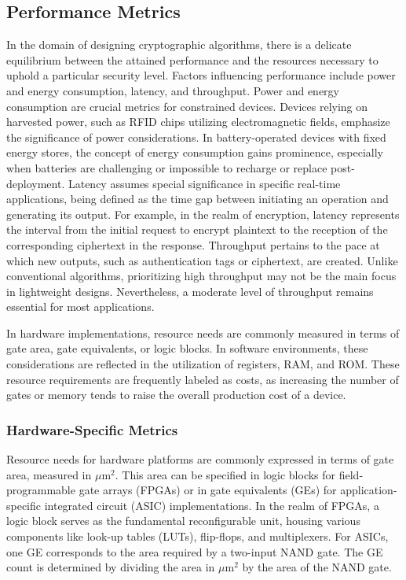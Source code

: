 \documentclass[conference,compsoc]{IEEEtran}
\begin{document}
\subsection{Performance Metrics} 
In the domain of designing cryptographic algorithms, there is a delicate equilibrium between the attained performance and the resources necessary to uphold a particular security level. Factors influencing performance include power and energy consumption, latency, and throughput.
Power and energy consumption are crucial metrics for constrained devices. Devices relying on harvested power, such as RFID chips utilizing electromagnetic fields, emphasize the significance of power considerations. In battery-operated devices with fixed energy stores, the concept of energy consumption gains prominence, especially when batteries are challenging or impossible to recharge or replace post-deployment.
Latency assumes special significance in specific real-time applications, being defined as the time gap between initiating an operation and generating its output. For example, in the realm of encryption, latency represents the interval from the initial request to encrypt plaintext to the reception of the corresponding ciphertext in the response.
Throughput pertains to the pace at which new outputs, such as authentication tags or ciphertext, are created. Unlike conventional algorithms, prioritizing high throughput may not be the main focus in lightweight designs. Nevertheless, a moderate level of throughput remains essential for most applications.

In hardware implementations, resource needs are commonly measured in terms of gate area, gate equivalents, or logic blocks. In software environments, these considerations are reflected in the utilization of registers, RAM, and ROM. These resource requirements are frequently labeled as costs, as increasing the number of gates or memory tends to raise the overall production cost of a device.
\subsubsection{Hardware-Specific Metrics} 
Resource needs for hardware platforms are commonly expressed in terms of gate area, measured in \(\mu \text{m}^2\). This area can be specified in logic blocks for field-programmable gate arrays (FPGAs) or in gate equivalents (GEs) for application-specific integrated circuit (ASIC) implementations.
In the realm of FPGAs, a logic block serves as the fundamental reconfigurable unit, housing various components like look-up tables (LUTs), flip-flops, and multiplexers.
For ASICs, one GE corresponds to the area required by a two-input NAND gate. The GE count is determined by dividing the area in \(\mu \text{m}^2\) by the area of the NAND gate.
\end{document}
